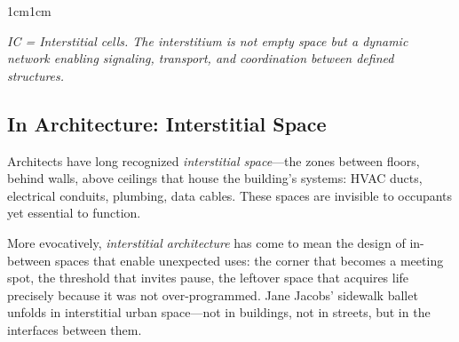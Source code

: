 \documentclass[../main.tex]{subfiles}
\begin{document}
\begin{adjustwidth}{1cm}{1cm}
\begin{center}
\small\textit{IC = Interstitial cells. The interstitium is not empty space but a dynamic network enabling signaling, transport, and coordination between defined structures.}\normalsize
\end{center}

\vspace{0.5cm}

\subsection*{In Architecture: Interstitial Space}

Architects have long recognized \textit{interstitial space}---the zones between floors, behind walls, above ceilings that house the building's systems: HVAC ducts, electrical conduits, plumbing, data cables. These spaces are invisible to occupants yet essential to function.

More evocatively, \textit{interstitial architecture} has come to mean the design of in-between spaces that enable unexpected uses: the corner that becomes a meeting spot, the threshold that invites pause, the leftover space that acquires life precisely because it was not over-programmed. Jane Jacobs' sidewalk ballet unfolds in interstitial urban space---not in buildings, not in streets, but in the interfaces between them.

\vspace{0.5cm}

\begin{center}
\end{center}
\end{adjustwidth}
\end{document}
